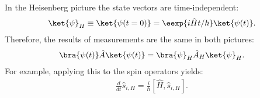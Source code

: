 In the Heisenberg picture the state vectors are time-in\-de\-pen\-dent:
\begin{align}
	\ket{\psi}_H \equiv \ket{\psi(t=0)}=\eexp{i{\hat{H}}t/{\hbar}} \ket{\psi(t)}.
\end{align}
Therefore, the results of measurements are the same in both pictures:
\begin{align}
\bra{\psi(t)}\hat{A}\ket{\psi(t)} = \bra{\psi}_H \hat{A}_H \ket{\psi}_H.
\end{align}
For example, applying this to the spin operators yields:
\begin{align}						\frac{d}{dt}\hat{s}_{i,H}=\frac{i}{\hbar}\left[\hat{H},\hat{s}_{i,H}\right].
\end{align}